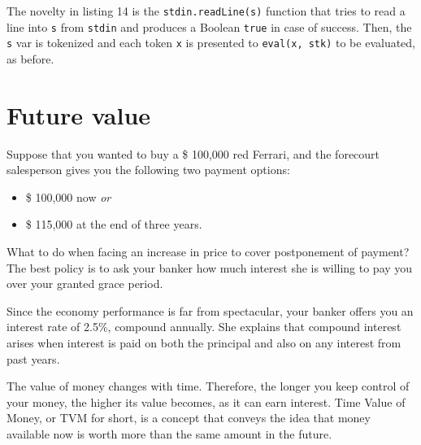 \documentclass[
  12pt,
]{book}
\providecommand{\tightlist}{%
  \setlength{\itemsep}{0pt}\setlength{\parskip}{0pt}}
\begin{document}
The novelty in listing 14 is the \texttt{stdin.readLine(s)} function
that tries to read a line into \texttt{s} from \texttt{stdin} and
produces a Boolean \texttt{true} in case of success. Then, the
\texttt{s} var is tokenized and each token \texttt{x} is presented to
\texttt{eval(x,\ stk)} to be evaluated, as before.

\section{Future value}\label{future-value}

Suppose that you wanted to buy a \$ 100,000 red Ferrari, and the
forecourt salesperson gives you the following two payment options:

\begin{itemize}
\tightlist
\item
  \$ 100,000 now \emph{or}
\item
  \$ 115,000 at the end of three years.
\end{itemize}

What to do when facing an increase in price to cover postponement of
payment? The best policy is to ask your banker how much interest she is
willing to pay you over your granted grace period.

Since the economy performance is far from spectacular, your banker
offers you an interest rate of 2.5\%, compound annually. She explains
that compound interest arises when interest is paid on both the
principal and also on any interest from past years.

The value of money changes with time. Therefore, the longer you keep
control of your money, the higher its value becomes, as it can earn
interest. Time Value of Money, or TVM for short, is a concept that
conveys the idea that money available now is worth more than the same
amount in the future.
\end{document}
